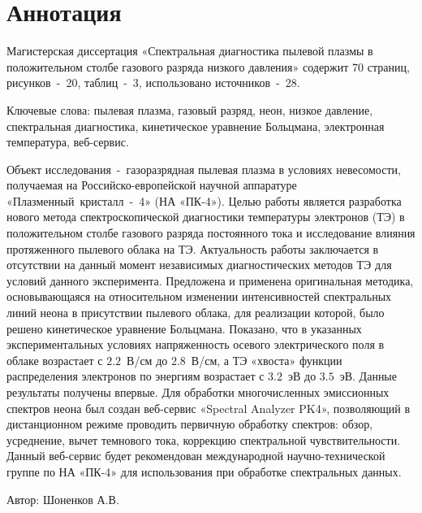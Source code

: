 \chapter*{Аннотация}

Магистерская диссертация «Спектральная диагностика пылевой плазмы в положительном столбе газового разряда низкого давления»
содержит 70 страниц, рисунков~-~20, таблиц~-~3, использовано источников~-~28.

Ключевые слова: пылевая плазма, газовый разряд, неон, низкое давление, спектральная диагностика,
кинетическое уравнение Больцмана, электронная температура, веб-сервис.

Объект исследования~-~газоразрядная пылевая плазма в условиях невесомости,
получаемая на Российско-европейской научной аппаратуре «Плазменный~кристалл~-~4» (НА «ПК-4»).
Целью работы является разработка нового метода спектроскопической диагностики температуры электронов (ТЭ) в
положительном столбе газового разряда постоянного тока и исследование влияния
протяженного пылевого облака на ТЭ. Актуальность работы
заключается в отсутствии на данный момент независимых диагностических методов
ТЭ для условий данного эксперимента.
Предложена и применена оригинальная методика, основывающаяся на
относительном изменении интенсивностей спектральных линий неона в
присутствии пылевого облака, для реализации которой, было решено
кинетическое уравнение Больцмана. Показано, что в указанных
экспериментальных условиях напряженность осевого электрического поля в облаке
возрастает с $2.2$~В/см до $2.8$~В/см, а ТЭ «хвоста» функции распределения
электронов по энергиям возрастает с $3.2$~эВ до $3.5$~эВ. Данные результаты
получены впервые. Для обработки многочисленных эмиссионных спектров неона
был создан веб-сервис «Spectral Analyzer PK4», позволяющий в дистанционном
режиме проводить первичную обработку спектров: обзор, усреднение, вычет
темнового тока, коррекцию спектральной чувствительности. Данный
веб-сервис будет рекомендован международной научно-технической группе по НА
«ПК-4» для использования при обработке спектральных данных.

\vfill
\vfill
\begin{minipage}{.49\textwidth}\end{minipage}
\hfill
\begin{minipage}{.49\textwidth}
    Автор: \uline{\hfill} Шоненков А.В.
\end{minipage}
\vfill
